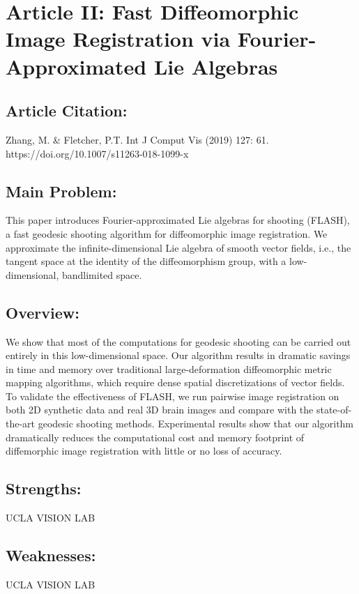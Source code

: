 \documentclass{article}
\begin{document}
\newpage

\section*{Article II: Fast Diffeomorphic Image Registration via Fourier-Approximated Lie Algebras}

\subsection*{Article Citation:} 

\begin{adjustwidth}{1cm}{}
	Zhang, M. \& Fletcher, P.T. Int J Comput Vis (2019) 127: 61. https://doi.org/10.1007/s11263-018-1099-x
\end{adjustwidth}


\subsection*{Main Problem:} 

\begin{adjustwidth}{1cm}{}
This paper introduces Fourier-approximated Lie algebras for shooting (FLASH), a fast geodesic shooting algorithm for diffeomorphic image registration. We approximate the infinite-dimensional Lie algebra of smooth vector fields, i.e., the tangent space at the identity of the diffeomorphism group, with a low-dimensional, bandlimited space. 
\end{adjustwidth}
\subsection*{Overview:} 

\begin{adjustwidth}{1cm}{}
	We show that most of the computations for geodesic shooting can be carried out entirely in this low-dimensional space. Our algorithm results in dramatic savings in time and memory over traditional large-deformation diffeomorphic metric mapping algorithms, which require dense spatial discretizations of vector fields. To validate the effectiveness of FLASH, we run pairwise image registration on both 2D synthetic data and real 3D brain images and compare with the state-of-the-art geodesic shooting methods. Experimental results show that our algorithm dramatically reduces the computational cost and memory footprint of diffemorphic image registration with little or no loss of accuracy.
\end{adjustwidth}

\subsection*{Strengths:} 

\begin{adjustwidth}{1cm}{}
	UCLA	VISION	LAB
\end{adjustwidth}

\subsection*{Weaknesses:} 

\begin{adjustwidth}{1cm}{}
	UCLA	VISION	LAB
\end{adjustwidth}
\end{document}
